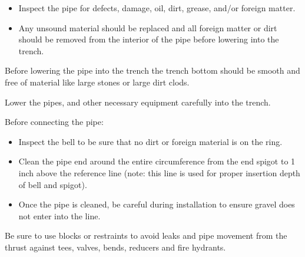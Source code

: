 \documentclass[10pt]{article}
\begin{document}
\begin{itemize}
  \item Inspect the pipe for defects, damage, oil, dirt, grease, and/or foreign matter.

  \item Any unsound material should be replaced and all foreign matter or dirt should be removed from the interior of the pipe before lowering into the trench.

\end{itemize}
Before lowering the pipe into the trench the trench bottom should be smooth and free of material like large stones or large dirt clods.

Lower the pipes, and other necessary equipment carefully into the trench.

Before connecting the pipe:

\begin{itemize}
  \item Inspect the bell to be sure that no dirt or foreign material is on the ring.

  \item Clean the pipe end around the entire circumference from the end spigot to 1 inch above the reference line (note: this line is used for proper insertion depth of bell and spigot).

  \item Once the pipe is cleaned, be careful during installation to ensure gravel does not enter into the line.

\end{itemize}
Be sure to use blocks or restraints to avoid leaks and pipe movement from the thrust against tees, valves, bends, reducers and fire hydrants.
\end{document}
